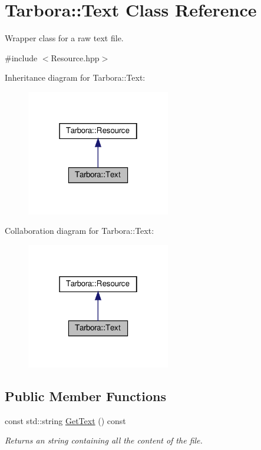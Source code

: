 \hypertarget{classTarbora_1_1Text}{}\section{Tarbora\+:\+:Text Class Reference}
\label{classTarbora_1_1Text}


Wrapper class for a raw text file.  




{\ttfamily \#include $<$Resource.\+hpp$>$}



Inheritance diagram for Tarbora\+:\+:Text\+:\nopagebreak
\begin{figure}[H]
\begin{center}
\leavevmode
\includegraphics[width=178pt]{classTarbora_1_1Text__inherit__graph}
\end{center}
\end{figure}


Collaboration diagram for Tarbora\+:\+:Text\+:\nopagebreak
\begin{figure}[H]
\begin{center}
\leavevmode
\includegraphics[width=178pt]{classTarbora_1_1Text__coll__graph}
\end{center}
\end{figure}
\subsection*{Public Member Functions}
\begin{DoxyCompactItemize}
\item 
\mbox{\label{classTarbora_1_1Text_a196ccb63a134aabf6336c1ae17c3108e}} 
const std\+::string \hyperlink{classTarbora_1_1Text_a196ccb63a134aabf6336c1ae17c3108e}{Get\+Text} () const
\begin{DoxyCompactList}\small\item\em Returns an string containing all the content of the file. \end{DoxyCompactList}\end{DoxyCompactItemize}
